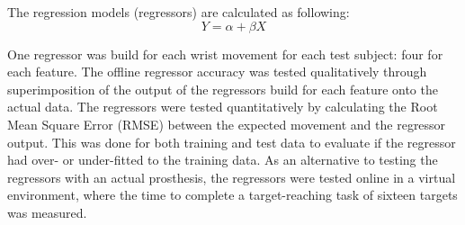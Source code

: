 \documentclass[landscape,a0paper,fontscale=0.375]{baposter} %
\begin{document}
\begin{poster}
{%
%
%
%
The regression models (regressors) are calculated as following:
\vspace{-0.1cm}
\begin{equation} \label{eq:simpleLinearRegression}
Y = \alpha + \beta X
\end{equation} \vspace{-0.7cm}


One regressor was build for each wrist movement for each test subject: four for each feature. The offline regressor accuracy was tested qualitatively through superimposition of the output of the regressors build for each feature onto the actual data. The regressors were tested quantitatively by calculating the Root Mean Square Error (RMSE) between the expected movement and the regressor output. This was done for both training and test data to evaluate if the regressor had over- or under-fitted to the training data. 
As an alternative to testing the regressors with an actual prosthesis, the regressors were tested online in a virtual environment, where the time to complete a target-reaching task of sixteen targets was measured. 

}
\end{poster}
\end{document}
